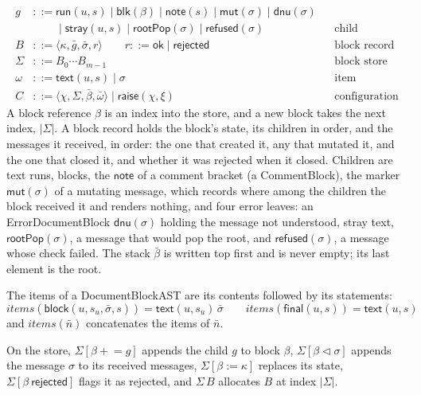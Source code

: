 \documentclass[11pt]{article}
\numberwithin{equation}{section}
\newcommand{\kw}[1]{\ensuremath{\mathsf{#1}}}
\begin{document}
\begin{equation}\label{eq:block-store}
\begin{aligned}
g &::= \kw{run}(u, s) \mid \kw{blk}(\beta) \mid \kw{note}(s)
  \mid \kw{mut}(\sigma) \mid \kw{dnu}(\sigma) \\
  &\phantom{{}::={}} \mid \kw{stray}(u, s)
  \mid \kw{rootPop}(\sigma) \mid \kw{refused}(\sigma)
  && \text{child} \\
B &::= \langle \kappa, \bar g, \bar\sigma, r \rangle
  \qquad r ::= \kw{ok} \mid \kw{rejected}
  && \text{block record} \\
\Sigma &::= B_0 \cdots B_{m-1}
  && \text{block store} \\
\omega &::= \kw{text}(u, s) \mid \sigma && \text{item} \\
C &::= \langle \chi, \Sigma, \bar\beta, \bar\omega \rangle
  \mid \kw{raise}(\chi, \xi)
  && \text{configuration}
\end{aligned}
\end{equation}
A block reference $\beta$ is an index into the store, and a new block takes
the next index, $|\Sigma|$.  A block record holds the block's state, its
children in order, and the messages it received, in order: the one that
created it, any that mutated it, and the one that closed it, and whether
it was rejected when it closed.  Children are
text runs, blocks, the $\kw{note}$ of a comment bracket (a CommentBlock),
the marker $\kw{mut}(\sigma)$ of a mutating message, which records where
among the children the block received it and renders nothing, and four
error leaves: an ErrorDocumentBlock $\kw{dnu}(\sigma)$ holding the
message not understood, stray text, $\kw{rootPop}(\sigma)$, a message
that would pop the root, and $\kw{refused}(\sigma)$, a message whose check
failed.  The stack $\bar\beta$ is written top first and is
never empty; its last element is the root.

The items of a DocumentBlockAST are its contents followed by its
statements:
\begin{equation}\label{eq:items}
\mathit{items}(\kw{block}(u, s_u, \bar\sigma, s)) = \kw{text}(u, s_u)\,\bar\sigma
\qquad
\mathit{items}(\kw{final}(u, s)) = \kw{text}(u, s)
\end{equation}
and $\mathit{items}(\bar n)$ concatenates the items of $\bar n$.

On the store, $\Sigma[\beta \mathrel{+}= g]$ appends the child $g$ to block
$\beta$, $\Sigma[\beta \mathrel{\lhd} \sigma]$ appends the message $\sigma$
to its received messages, $\Sigma[\beta := \kappa]$ replaces its state,
$\Sigma[\beta\ \kw{rejected}]$ flags it as rejected, and
$\Sigma\,B$ allocates $B$ at index $|\Sigma|$.
\end{document}
